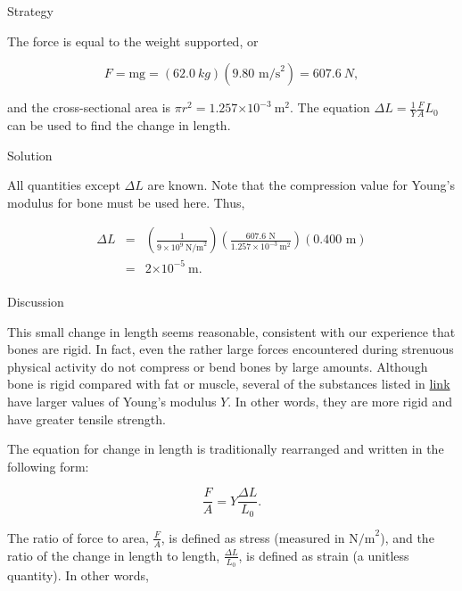 \documentclass[
]{book}
\begin{document}
{Strategy}

The force is equal to the weight supported, or

\leavevmode{}%
\[{{{{F = \text{mg}} = \left( {\text{62}\text{.}0\ kg} \right)}{\left( {9\text{.}\text{80\ m}\text{/s}^{2}} \right) = \text{607}}\text{.}6\ N},}{}\]

and the cross-sectional area is
\({{{\pi r}^{2} = 1}\text{.}\text{257}{\times \text{10}^{- 3}}\ \text{m}^{2}}{}\).
The equation \({{\Delta L = \frac{1}{Y}}\frac{F}{A}L_{0}}{}\) can be used
to find the change in length.

{Solution}

All quantities except \({\Delta L}{}\) are known. Note that the
compression value for Young's modulus for bone must be used here. Thus,

\leavevmode{}%
\[\begin{array}{lll}
{\Delta L} & = & {\left( \frac{1}{{9 \times \text{10}^{9}}\ \text{N/m}^{2}} \right)\left( \frac{\text{607}\text{.}\text{6\ N}}{1.{\text{257} \times \text{10}^{- 3}\ }\text{m}^{2}} \right)(0\text{.}\text{400\ m})} \\
 & = & {2{\times \text{10}^{-5}}\ \text{m.}} \\
\end{array}{}\]

{Discussion}

This small change in length seems reasonable, consistent with our
experience that bones are rigid. In fact, even the rather large forces
encountered during strenuous physical activity do not compress or bend
bones by large amounts. Although bone is rigid compared with fat or
muscle, several of the substances listed in
\protect\hyperlink{import-auto-id1165298671576}{link} have larger
values of Young's modulus \(Y{}\). In other words, they are more rigid
and have greater tensile strength.

The equation for change in length is traditionally rearranged and
written in the following form:

\leavevmode{}%
\[{{\frac{F}{A} = Y}\frac{\Delta L}{L_{0}}}.{}\]

The ratio of force to area, \emph{\(\frac{F}{A}{}\)}, is defined as
\protect\hypertarget{import-auto-id1165298867113}{}{stress} (measured in
\(\text{N/m}^{\text{2}}\)), and the ratio of the change in length to
length, \(\frac{\Delta L}{L_{0}}{}\), is defined as
\protect\hypertarget{import-auto-id1165298883978}{}{strain} (a unitless
quantity). In other words,
\end{document}
